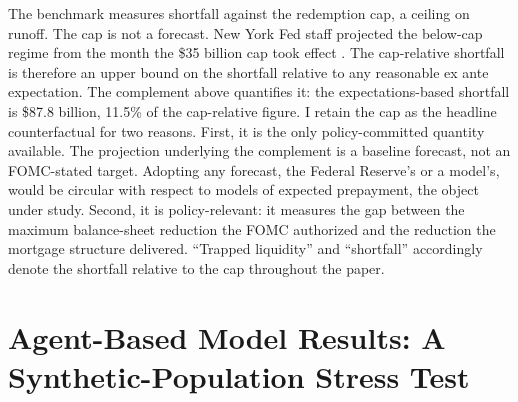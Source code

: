 \documentclass[12pt]{article}
\begin{document}
The benchmark measures shortfall against the redemption cap, a ceiling on runoff. The cap is not a forecast. New York Fed staff projected the below-cap regime from the month the \$35 billion cap took effect \citep{nyfed2022}. The cap-relative shortfall is therefore an upper bound on the shortfall relative to any reasonable ex ante expectation. The complement above quantifies it: the expectations-based shortfall is \$87.8 billion, 11.5\% of the cap-relative figure. I retain the cap as the headline counterfactual for two reasons. First, it is the only policy-committed quantity available. The projection underlying the complement is a baseline forecast, not an FOMC-stated target. Adopting any forecast, the Federal Reserve's or a model's, would be circular with respect to models of expected prepayment, the object under study. Second, it is policy-relevant: it measures the gap between the maximum balance-sheet reduction the FOMC authorized and the reduction the mortgage structure delivered. ``Trapped liquidity'' and ``shortfall'' accordingly denote the shortfall relative to the cap throughout the paper.
\section{Agent-Based Model Results: A Synthetic-Population Stress Test}\label{sec:abm}
\end{document}
